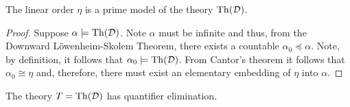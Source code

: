 \begin{thm}
	The linear order $\eta$ is a prime model of the theory $\operatorname{Th}(\mathcal{D})$.
\end{thm}
\begin{proof} Suppose $\alpha\models\operatorname{Th}(\mathcal{D})$.  Note $\alpha$ must be
	infinite and thus, from the Downward L\"owenheim-Skolem Theorem, there exists a
	countable $\alpha_0\preccurlyeq\alpha$. Note, by definition, it follows that
	$\alpha_{0}\models\operatorname{Th}(\mathcal{D})$.  From Cantor's theorem it follows that
	$\alpha_0\cong\eta$ and, therefore, there must exist an elementary embedding of
	$\eta$ into $\alpha$.
\end{proof}

\begin{thm}
	The theory $T=\operatorname{Th}(\mathcal{D})$ has quantifier elimination.
\end{thm}
